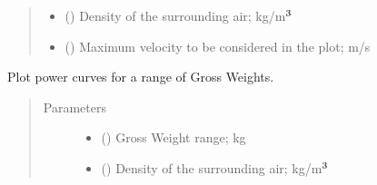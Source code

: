 \documentclass[letterpaper,10pt,english]{sphinxmanual}
\begin{document}
\begin{fulllineitems}
\begin{fulllineitems}
\begin{quote}
\begin{description}
\begin{itemize}
\item {} 
\sphinxAtStartPar
{} () \textendash{} Density of the surrounding air; kg/m\(\sp{\text{3}}\)

\item {} 
\sphinxAtStartPar
{} (\sphinxstyleliteralemphasis{\sphinxupquote{, }}) \textendash{} Maximum velocity to be considered in the plot; m/s

\end{itemize}

\end{description}\end{quote}

\end{fulllineitems}


\begin{fulllineitems}
\label{\detokenize{modules/helicopter:helicopter.Helicopter.plot_power_sweep_gw}}
\sphinxAtStartPar
Plot power curves for a range of Gross Weights.
\begin{quote}\begin{description}
\item[{Parameters}] \leavevmode\begin{itemize}
\item {} 
\sphinxAtStartPar
{} (\sphinxstyleliteralemphasis{\sphinxupquote{(}}\sphinxstyleliteralemphasis{\sphinxupquote{, }}\sphinxstyleliteralemphasis{\sphinxupquote{, }}\sphinxstyleliteralemphasis{\sphinxupquote{)}}) \textendash{} Gross Weight range; kg

\item {} 
\sphinxAtStartPar
{} () \textendash{} Density of the surrounding air; kg/m\(\sp{\text{3}}\)


\end{itemize}
\end{description}
\end{quote}
\end{fulllineitems}
\end{fulllineitems}
\end{document}
